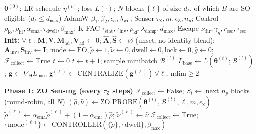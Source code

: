 \documentclass[conference]{IEEEtran}
\begin{document}
\begin{algorithm*}[!t]
\footnotesize
\caption{Trinity Optimization Framework}
\label{alg:trinity}
\begin{algorithmic}[1]
\Require $\boldsymbol{\theta}^{(0)}$; LR schedule $\eta^{(t)}$; loss $L(\cdot)$; $N$ blocks $\{\ell\}$ of size $d_\ell$, of which $B$ are SO-eligible ($d_\ell \le d_{\mathrm{max}}$)
\Require AdamW $\beta_1, \beta_2, \epsilon_a, \lambda_{\mathrm{wd}}$; Sensor $\tau_{\mathrm{Z}}, m, \epsilon_{\mathrm{Z}}, n_p$; Control $\rho_{\mathrm{lo}}, \rho_{\mathrm{hi}}, \alpha_{\mathrm{ema}}, \tau_{\mathrm{dwell}}, \beta_{\mathrm{max}}$; K-FAC $\tau_{\mathrm{stat}}, \tau_{\mathrm{inv}}, \rho_{\mathrm{kf}}, \lambda_{\mathrm{damp}}, d_{\mathrm{max}}$; Escape $\nu_{\mathrm{thr}}, \gamma_g, r_{\mathrm{esc}}, \tau_{\mathrm{esc}}$
\State \textbf{Init:} $\forall \ell$: $\mathbf{M}, \mathbf{V}, \mathbf{M}_{\mathrm{ad}}, \mathbf{V}_{\mathrm{ad}} \leftarrow 0$; $\hat{\mathbf{A}}, \hat{\mathbf{S}} \leftarrow \varnothing$ (unset, no identity blend); $\mathbf{A}_{\mathrm{inv}}, \mathbf{S}_{\mathrm{inv}} \leftarrow \mathbf{I}$; $\mathrm{mode} \leftarrow \mathrm{FO}, \tilde{\rho} \leftarrow 1, \tilde{\nu} \leftarrow 0, \mathrm{dwell} \leftarrow 0, \mathrm{lock} \leftarrow 0, \bar{g} \leftarrow 0$; $\mathcal{F}_{\mathrm{collect}} \leftarrow \mathrm{True}; t \leftarrow 0$
    \State $t \leftarrow t + 1$; sample minibatch $\mathcal{B}^{(t)}$
    \State $L_{\mathrm{base}} \leftarrow L(\boldsymbol{\theta}^{(t)}; \mathcal{B}^{(t)})$; $\mathbf{g} \leftarrow \nabla_{\boldsymbol{\theta}} L_{\mathrm{base}}$ 
     \State $\mathbf{g}^{(\ell)} \leftarrow \mathrm{CENTRALIZE}(\mathbf{g}^{(\ell)})\ \forall \ell,\ \mathrm{ndim} \ge 2$ \EndIf

    \Statex \textbf{Phase 1: ZO Sensing (every $\tau_{\mathrm{Z}}$ steps)}
        \State $\mathcal{F}_{\mathrm{collect}} \leftarrow \mathrm{False}$; $S_t \leftarrow$ next $n_p$ blocks (round-robin, all $N$) 
            \State $(\hat{\rho}, \hat{\nu}) \leftarrow \mathrm{ZO\_PROBE}(\boldsymbol{\theta}^{(t)}, \mathcal{B}^{(t)}, \ell, m, \epsilon_{\mathrm{Z}})$
            \State $\tilde{\rho}^{(\ell)} \leftarrow \alpha_{\mathrm{ema}} \tilde{\rho}^{(\ell)} + (1-\alpha_{\mathrm{ema}}) \hat{\rho}$; $\tilde{\nu}^{(\ell)} \leftarrow \hat{\nu}$
        \EndFor
        \State $\mathcal{F}_{\mathrm{collect}} \leftarrow \mathrm{True}$; $\{\mathrm{mode}^{(\ell)}\} \leftarrow \mathrm{CONTROLLER}(\{\tilde{\rho}\}, \{\mathrm{dwell}\}, \beta_{\mathrm{max}})$
    \EndIf


\end{algorithmic}
\end{algorithm*}
\end{document}
